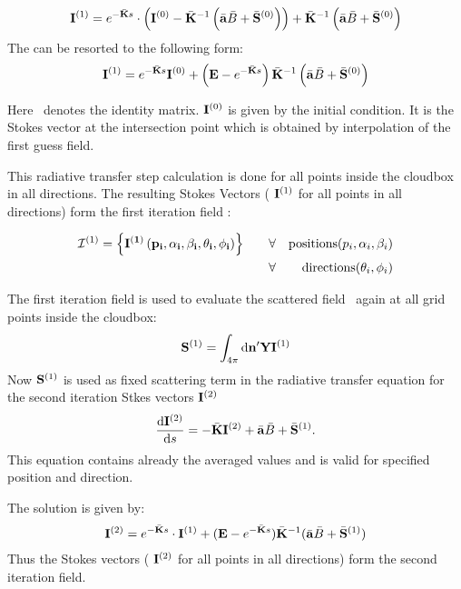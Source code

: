 \begin{eqnarray}
  {\bf I}^{(1)} =  e^{-\bar{{\bf K}}s}\cdot\left({\bf I}^{(0)} -\bar{{\bf K}}^{-1}\left(\bar{{\bf a}} \bar{B} +\bar{{\bf S}}^{(0)}\right)\right) + 
 \bar{{\bf K}}^{-1}\left(\bar{{\bf a}} \bar{B} +\bar{{\bf S}}^{(0)}\right)
\end{eqnarray}
The can be resorted to the following form:
\begin{eqnarray}
\label{eq:scattering:vrte_sol}
 {\bf I}^{(1)} =  e^{-\bar{{\bf K}}s} {\bf I}^{(0)} + \left( {\bf E} -  e^{-\bar{{\bf K}}s}\right)  \bar{{\bf K}}^{-1}\left(\bar{{\bf a}} \bar{B} +\bar{{\bf S}}^{(0)}\right)
\end{eqnarray}

Here \IdnMat\ denotes the identity matrix.  ${\bf I}^{(0)}$ is given
by the initial condition. It is the Stokes vector at the intersection
point which is obtained by interpolation of the first guess field.

This radiative transfer step calculation is done for all points inside
the cloudbox in all directions. The resulting Stokes Vectors (
${\bf I}^{(1)}$ for all points in all directions) form the first
iteration field :

\begin{eqnarray}
{\mathcal I}^{(1)} = \left\{ \bf{I}^{(1)} \left( p_i, \alpha_i, \beta_i, \theta_i, \phi_i\right)\right\}  \qquad  
&\forall& {\rm positions } (p_i,\alpha_i, \beta_i)\\
&\forall& {\rm directions } (\theta_i,\phi_i)
\end{eqnarray}



  The first iteration field is used to evaluate the scattered field
  \ScaInt\ again at all grid points inside the cloudbox:
\begin{eqnarray}
  {\bf S}^{(1)} = \int_{4\pi} \mathrm{d} {\bf n}^\prime
  {\bf Y} {\bf I}^{(1)} 
\end{eqnarray}
Now ${\bf S}^{(1)}$ is used as fixed scattering term in the radiative
transfer equation for the second iteration Stkes vectors ${\bf I}^{(2)}$
\begin{eqnarray}
     \frac{\mathrm{d} {\bf I}^{(2)}}{\mathrm{d} s} =
     -\bar{{\bf K}} {\bf I}^{(2)} + \bar{{\bf a}} \bar{B}
     +\bar{{\bf S}}^{(1)}.
\end{eqnarray} 
This equation contains already the averaged values and is valid for
specified position and direction.
 
The solution is given by:
\begin{eqnarray}
   {\bf I}^{(2)} = e^{-\bar{{\bf K}} s}\cdot{\bf I}^{(1)} + ({\bf E} - e^{-\bar{{\bf K}}
    s}) \bar{{\bf K}}^{-1} (\bar{{\bf a}} \bar{B} + \bar{{\bf S}}^{(1)})
\end{eqnarray}
Thus the Stokes vectors ( ${\bf I}^{(2)}$ for all points in all
directions) form the second iteration field.

